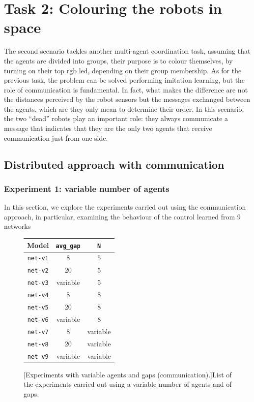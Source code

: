 \section{Task 2: Colouring the robots in space}
\label{sec:task2}

The second scenario tackles another multi-agent coordination task, assuming that 
the agents are divided into groups, their purpose is to colour themselves, by 
turning on their top \gls{rgb} \gls{led}, depending on their group membership. 
As for the previous task, the problem can be solved performing imitation 
learning, but the role of communication is fundamental. In fact, what makes the 
difference are not the distances perceived by the robot sensors but the messages 
exchanged between the agents, which are they only mean to determine their 
order. 
In this scenario, the two ``dead'' robots play an important role: they always 
communicate a message that indicates that they are the only two agents that 
receive communication just from one side.

\subsection{Distributed approach with communication}
\label{subsec:task2-exp-comm}

\subsubsection{Experiment 1: variable number of agents}
\label{subsubsec:task2-exp-comm-1}
In this section, we explore the experiments carried out using the communication 
approach, in particular, examining the behaviour of the control learned from 9 
networks 
\begin{figure}[!htb]
	\centering
	\begin{tabular}{ccc}
		\toprule
		\textbf{Model} \quad & \textbf{\texttt{avg\_gap}} & \textbf{\texttt{N}}\\
		\midrule
		\texttt{net-v1}   &  $8$		 &	 $5$ \\
		\texttt{net-v2}   &  $20$		&	$5$ \\
		\texttt{net-v3}   &  variable   &    $5$\\
		\texttt{net-v4}   &  $8$		 &	  $8$ \\
		\texttt{net-v5}   & $20$   		&	 $8$ \\
		\texttt{net-v6}   &  variable	&	 $8$ \\
		\texttt{net-v7}   &  $ 8$		  &	 variable\\
		\texttt{net-v8}   &  $20$		 &	variable\\
		\texttt{net-v9}   &  variable	 &	variable\\
		\bottomrule
	\end{tabular}
	[Experiments with variable agents and gaps 
	(communication).]{List of the experiments carried out using a variable number 
		of agents and of gaps.}
	\label{tab:modelcommt2}
\end{figure}

